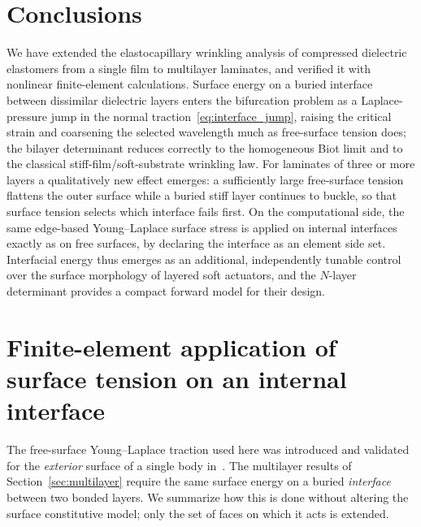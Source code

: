 \documentclass[final,3p,times]{elsarticle}
\begin{document}
\section{Conclusions}

We have extended the elastocapillary wrinkling analysis of compressed dielectric elastomers from a single film to multilayer laminates, and verified it with nonlinear finite-element calculations. Surface energy on a buried interface between dissimilar dielectric layers enters the bifurcation problem as a Laplace-pressure jump in the normal traction~\eqref{eq:interface_jump}, raising the critical strain and coarsening the selected wavelength much as free-surface tension does; the bilayer determinant reduces correctly to the homogeneous Biot limit and to the classical stiff-film/soft-substrate wrinkling law. For laminates of three or more layers a qualitatively new effect emerges: a sufficiently large free-surface tension flattens the outer surface while a buried stiff layer continues to buckle, so that surface tension selects which interface fails first. On the computational side, the same edge-based Young--Laplace surface stress is applied on internal interfaces exactly as on free surfaces, by declaring the interface as an element side set. Interfacial energy thus emerges as an additional, independently tunable control over the surface morphology of layered soft actuators, and the $N$-layer determinant provides a compact forward model for their design.

\appendix
\section{Finite-element application of surface tension on an internal interface}
\label{app:interface}

The free-surface Young--Laplace traction used here was introduced and validated for the \emph{exterior} surface of a single body in~\citet{seifiIJSS2016}. The multilayer results of Section~\ref{sec:multilayer} require the same surface energy on a buried \emph{interface} between two bonded layers. We summarize how this is done without altering the surface constitutive model; only the set of faces on which it acts is extended.
\end{document}
